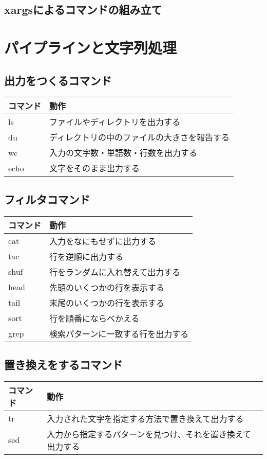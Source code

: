 \subsection{xargsによるコマンドの組み立て}


\section{パイプラインと文字列処理}

\subsection{出力をつくるコマンド}
\begin{tabular}{ll}
    コマンド & 動作 \\ \hline
    ls & ファイルやディレクトリを出力する \\
    du & ディレクトリの中のファイルの大きさを報告する\\
    wc & 入力の文字数・単語数・行数を出力する\\
    echo & 文字をそのまま出力する\\ \hline
\end{tabular}


\subsection{フィルタコマンド}
\begin{tabular}{ll}
    コマンド & 動作 \\ \hline
    cat & 入力をなにもせずに出力する \\
    tac & 行を逆順に出力する\\
    shuf & 行をランダムに入れ替えて出力する \\
    head & 先頭のいくつかの行を表示する \\
    tail & 末尾のいくつかの行を表示する\\
    sort & 行を順番にならべかえる\\
    grep & 検索パターンに一致する行を出力する\\ \hline
\end{tabular}


\subsection{置き換えをするコマンド}
\begin{tabular}{ll}
    コマンド & 動作 \\ \hline
    tr & 入力された文字を指定する方法で置き換えて出力する \\
    sed & 入力から指定するパターンを見つけ、それを置き換えて出力する \\ \hline
\end{tabular}


